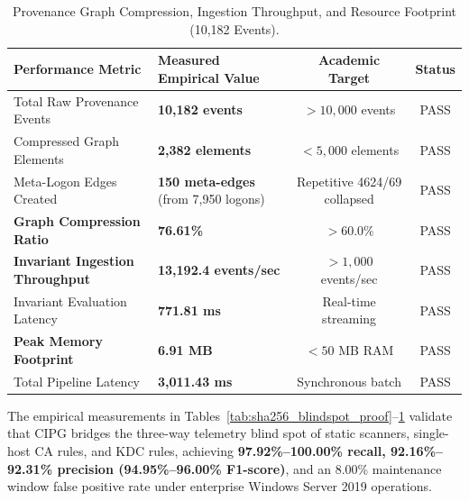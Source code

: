 \begin{table}[htbp]
\centering
\small
\caption{Provenance Graph Compression, Ingestion Throughput, and Resource Footprint (10,182 Events).}
\label{tab:provenance_scalability}
\begin{tabularx}{\textwidth}{lXcc}
\toprule
\textbf{Performance Metric} & \textbf{Measured Empirical Value} & \textbf{Academic Target} & \textbf{Status} \\
\midrule
Total Raw Provenance Events & \textbf{10,182 events} & $> 10,000$ events & PASS \\
Compressed Graph Elements & \textbf{2,382 elements} & $< 5,000$ elements & PASS \\
Meta-Logon Edges Created & \textbf{150 meta-edges} (from 7,950 logons) & Repetitive 4624/69 collapsed & PASS \\
\textbf{Graph Compression Ratio} & \textbf{76.61\%} & $> 60.0\%$ & PASS \\
\textbf{Invariant Ingestion Throughput} & \textbf{13,192.4 events/sec} & $> 1,000$ events/sec & PASS \\
Invariant Evaluation Latency & \textbf{771.81 ms} & Real-time streaming & PASS \\
\textbf{Peak Memory Footprint} & \textbf{6.91 MB} & $< 50$ MB RAM & PASS \\
Total Pipeline Latency & \textbf{3,011.43 ms} & Synchronous batch & PASS \\
\bottomrule
\end{tabularx}
\end{table}

The empirical measurements in Tables~\ref{tab:sha256_blindspot_proof}--\ref{tab:provenance_scalability} validate that CIPG bridges the three-way telemetry blind spot of static scanners, single-host CA rules, and KDC rules, achieving \textbf{97.92\%--100.00\% recall, 92.16\%--92.31\% precision (94.95\%--96.00\% F1-score)}, and an 8.00\% maintenance window false positive rate under enterprise Windows Server 2019 operations.
